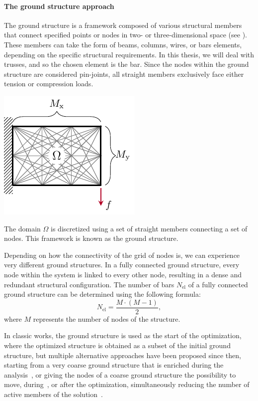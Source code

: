 \paragraph{The ground structure approach}
The ground structure is a framework composed of various structural members that connect specified points or nodes in two- or three-dimensional space (see ). These members can take the form of beams, columns, wires, or bars elements, depending on the specific structural requirements. In this thesis, we will deal with trusses, and so the chosen element is the bar. Since the nodes within the ground structure are considered pin-joints, all straight members exclusively face either tension or compression loads. 
\begin{marginfigure}
    \centering
    \includegraphics{figures/03_comparison_TO_TTO/04_disc_mesh/d_mesh.pdf}
    \caption{The domain $\Omega$ is discretized using a set of straight members connecting a set of nodes. This framework is known as the ground structure.}
    \label{fig:03_mesh_d}
\end{marginfigure}

Depending on how the connectivity of the grid of nodes is, we can experience very different ground structures. In a fully connected ground structure, every node within the system is linked to every other node, resulting in a dense and redundant structural configuration. The number of bars $N_{\text{el}}$ of a fully connected ground structure can be determined using the following formula:
\begin{equation}
    N_{\text{el}} = \frac{M \cdot (M-1)}{2},
\end{equation}
where $M$ represents the number of nodes of the structure.

In classic works, the ground structure is used as the start of the optimization, where the optimized structure is obtained as a subset of the initial ground structure, but multiple alternative approaches have been proposed since then, \eg starting from a very coarse ground structure that is enriched during the analysis~, or giving the nodes of a coarse ground structure the possibility to move, during~, or after the optimization, simultaneously reducing the number of active members of the solution~.

